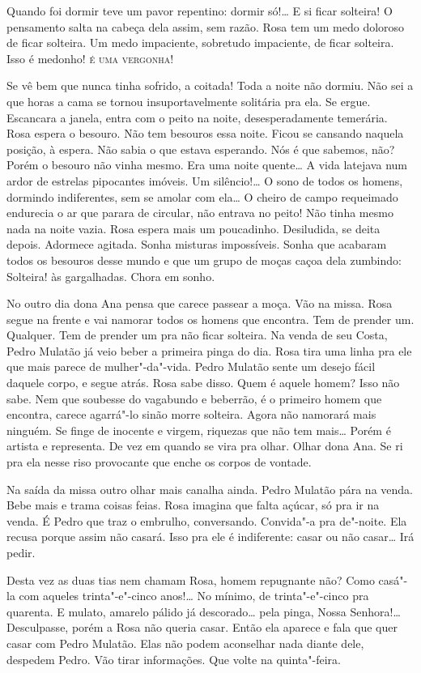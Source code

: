 Quando foi dormir teve um pavor repentino: dormir só!\ldots{} E si ficar
solteira! O pensamento salta na cabeça dela assim, sem razão. Rosa tem
um medo doloroso de ficar solteira. Um medo impaciente, sobretudo
impaciente, de ficar solteira. Isso é medonho! \textsc{é uma vergonha}! 

Se vê bem que nunca tinha sofrido, a coitada! Toda a noite não dormiu.
Não sei a que horas a cama se tornou insuportavelmente solitária pra
ela. Se ergue. Escancara a janela, entra com o peito na noite,
desesperadamente temerária. Rosa espera o besouro. Não tem besouros essa
noite. Ficou se cansando naquela posição, à espera. Não sabia o que
estava esperando. Nós é que sabemos, não? Porém o besouro não vinha
mesmo. Era uma noite quente\ldots{} A vida latejava num ardor de estrelas
pipocantes imóveis. Um silêncio!\ldots{} O sono de todos os homens, dormindo
indiferentes, sem se amolar com ela\ldots{} O cheiro de campo requeimado
endurecia o ar que parara de circular, não entrava no peito! Não tinha
mesmo nada na noite vazia. Rosa espera mais um poucadinho. Desiludida,
se deita depois. Adormece agitada. Sonha misturas impossíveis. Sonha que
acabaram todos os besouros desse mundo e que um grupo de moças caçoa
dela zumbindo: Solteira! às gargalhadas. Chora em sonho.

No outro dia dona Ana pensa que carece passear a moça. Vão na missa.
Rosa segue na frente e vai namorar todos os homens que encontra. Tem de
prender um. Qualquer. Tem de prender um pra não ficar solteira. Na venda
de seu Costa, Pedro Mulatão já veio beber a primeira pinga do dia. Rosa
tira uma linha pra ele que mais parece de mulher"-da"-vida. Pedro Mulatão
sente um desejo fácil daquele corpo, e segue atrás. Rosa sabe disso.
Quem é aquele homem? Isso não sabe. Nem que soubesse do vagabundo e
beberrão, é o primeiro homem que encontra, carece agarrá"-lo sinão morre
solteira. Agora não namorará mais ninguém. Se finge de inocente e
virgem, riquezas que não tem mais\ldots{} Porém é artista e representa. De
vez em quando se vira pra olhar. Olhar dona Ana. Se ri pra ela nesse
riso provocante que enche os corpos de vontade.

Na saída da missa outro olhar mais canalha ainda. Pedro Mulatão pára na
venda. Bebe mais e trama coisas feias. Rosa imagina que falta açúcar, só
pra ir na venda. É Pedro que traz o embrulho, conversando. Convida"-a pra
de"-noite. Ela recusa porque assim não casará. Isso pra ele é
indiferente: casar ou não casar\ldots{} Irá pedir.

Desta vez as duas tias nem chamam Rosa, homem repugnante não? Como
casá"-la com aqueles trinta"-e"-cinco anos!\ldots{} No mínimo, de trinta"-e"-cinco
pra quarenta. E mulato, amarelo pálido já descorado\ldots{} pela pinga, Nossa
Senhora!\ldots{} Desculpasse, porém a Rosa não queria casar. Então ela
aparece e fala que quer casar com Pedro Mulatão. Elas não podem
aconselhar nada diante dele, despedem Pedro. Vão tirar informações. Que
volte na quinta"-feira.

